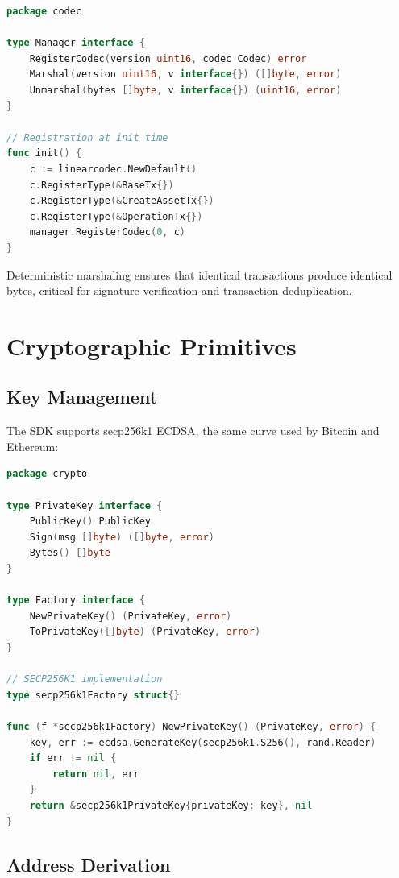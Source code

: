 \documentclass[11pt,twocolumn]{article}
\begin{document}
\begin{lstlisting}[language=Go,caption=Codec Registration]
package codec

type Manager interface {
    RegisterCodec(version uint16, codec Codec) error
    Marshal(version uint16, v interface{}) ([]byte, error)
    Unmarshal(bytes []byte, v interface{}) (uint16, error)
}

// Registration at init time
func init() {
    c := linearcodec.NewDefault()
    c.RegisterType(&BaseTx{})
    c.RegisterType(&CreateAssetTx{})
    c.RegisterType(&OperationTx{})
    manager.RegisterCodec(0, c)
}
\end{lstlisting}

Deterministic marshaling ensures that identical transactions produce identical bytes, critical for signature verification and transaction deduplication.

\section{Cryptographic Primitives}

\subsection{Key Management}

The SDK supports secp256k1 ECDSA, the same curve used by Bitcoin and Ethereum:

\begin{lstlisting}[language=Go,caption=Key Operations]
package crypto

type PrivateKey interface {
    PublicKey() PublicKey
    Sign(msg []byte) ([]byte, error)
    Bytes() []byte
}

type Factory interface {
    NewPrivateKey() (PrivateKey, error)
    ToPrivateKey([]byte) (PrivateKey, error)
}

// SECP256K1 implementation
type secp256k1Factory struct{}

func (f *secp256k1Factory) NewPrivateKey() (PrivateKey, error) {
    key, err := ecdsa.GenerateKey(secp256k1.S256(), rand.Reader)
    if err != nil {
        return nil, err
    }
    return &secp256k1PrivateKey{privateKey: key}, nil
}
\end{lstlisting}

\subsection{Address Derivation}
\end{document}
